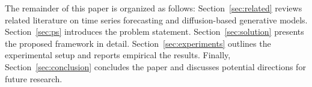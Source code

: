 
The remainder of this paper is organized as follows: 
Section~\ref{sec:related} reviews related literature on time series forecasting and diffusion-based generative models. 
Section~\ref{sec:ps} introduces the problem statement.
Section~\ref{sec:solution} presents the proposed \solutionSimpleName{} framework in detail. 
Section~\ref{sec:experiments} outlines the experimental setup and reports empirical the results. 
Finally, Section~\ref{sec:conclusion} concludes the paper and discusses potential directions for future research.







